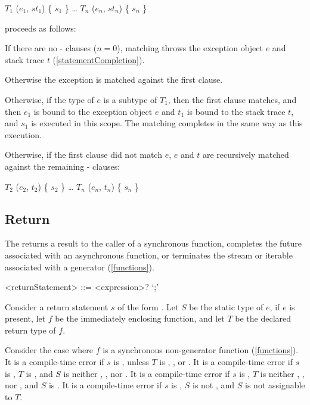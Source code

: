 \documentclass[makeidx]{article}
\begin{document}
{\begin{normativeDartCode}
\ON{} $T_1$ \CATCH{} ($e_1$, $st_1$) \{ $s_1$ \}
\ldots
\ON{} $T_n$ \CATCH{} ($e_n$, $st_n$) \{ $s_n$ \}
\end{normativeDartCode}
proceeds as follows:

\LMHash{}%
If there are no \ON{}-\CATCH{} clauses ($n = 0$), matching throws the exception object $e$ and stack trace $t$ (\ref{statementCompletion}).

\LMHash{}%
Otherwise the exception is matched against the first clause.

\LMHash{}%
Otherwise, if the type of $e$ is a subtype of $T_1$, then the first clause matches, and then $e_1$ is bound to the exception object $e$ and $t_1$ is bound to the stack trace $t$, and $s_1$ is executed in this scope.
The matching completes in the same way as this execution.

\LMHash{}%
Otherwise, if the first clause did not match $e$, $e$ and $t$ are recursively matched against the remaining \ON{}-\CATCH{} clauses:

\begin{normativeDartCode}
\ON{} $T_2$ \CATCH{} ($e_2$, $t_2$) \{ $s_2$ \}
\ldots
\ON{} $T_n$ \CATCH{} ($e_n$, $t_n$) \{ $s_n$ \}
\end{normativeDartCode}


\subsection{Return}

\LMHash{}%
The 
returns a result to the caller of a synchronous function,
completes the future associated with an asynchronous function,
or terminates the stream or iterable associated with a generator
(\ref{functions}).

\begin{grammar}
<returnStatement> ::= \RETURN{} <expression>? `;'
\end{grammar}

\LMHash{}%
Consider a return statement $s$ of the form .
Let $S$ be the static type of $e$, if $e$ is present,
let $f$ be the immediately enclosing function,
and let $T$ be the declared return type of $f$.

\LMHash{}%
Consider the case where $f$ is a synchronous non-generator function
(\ref{functions}).
%
It is a compile-time error if $s$ is \code{\RETURN{};},
unless $T$ is \VOID, \DYNAMIC, or .
%
It is a compile-time error if $s$ is ,
$T$ is \VOID,
and $S$ is neither \VOID, \DYNAMIC, nor .
%
It is a compile-time error if $s$ is ,
$T$ is neither \VOID, \DYNAMIC, nor ,
and $S$ is \VOID.
%
It is a compile-time error if $s$ is ,
$S$ is not \VOID,
and $S$ is not assignable to $T$.

}
\end{document}
